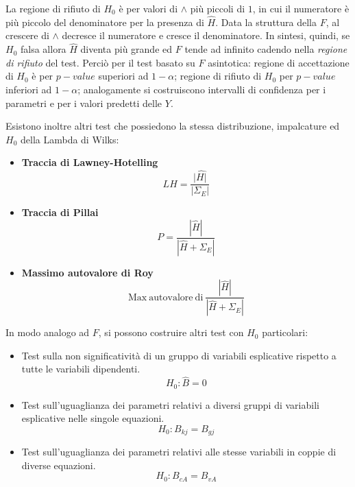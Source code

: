 \documentclass[a4page, 11pt]{article} %
\begin{document}
La regione di rifiuto di $H_0$ è per valori di $\wedge$ più piccoli di $1$, in cui il numeratore è più piccolo del denominatore per la presenza di $\hat{H}$.
Data la struttura della $F$, al crescere di $\wedge$ decresce il numeratore e cresce il denominatore. In sintesi, quindi, se $H_0$ falsa allora $\hat{H}$ diventa più grande ed $F$ tende ad infinito cadendo nella \textit{regione di rifiuto} del test.
\newline
\newline
Perciò per il test basato su $F$ asintotica:
regione di accettazione di $H_0$ è per $p-value$ superiori ad $1-\alpha$;
regione di rifiuto di $H_0$ per $p-value$ inferiori ad $1-\alpha$;
analogamente si costruiscono intervalli di confidenza per i parametri e per i valori predetti delle $Y$.

Esistono inoltre altri test che possiedono la stessa distribuzione, impalcature ed $H_0$ della Lambda di Wilks:
\begin{itemize}[noitemsep]
\item \textbf{Traccia di Lawney-Hotelling}
\begin{equation*}
LH = \frac{|\hat{H|}}{|\Sigma_E|}
\end{equation*}
\item \textbf{Traccia di Pillai}
\begin{equation*}
P = \frac{|\hat{H}|}{|\hat{H}+\Sigma_E|}
\end{equation*}
\item \textbf{Massimo autovalore di Roy}
\begin{equation*}
\mathrm{Max \ autovalore\  di \ } \frac{|\hat{H}|}{|\hat{H}+\Sigma_E|}
\end{equation*}
\end{itemize}
In modo analogo ad $F$, si possono costruire altri test con $H_0$ particolari:
\begin{itemize}[noitemsep]
\item Test sulla non significatività di un gruppo di variabili esplicative rispetto a tutte le variabili dipendenti.
\begin{equation*}
H_0 : \hat{B} = 0
\end{equation*}
\item Test sull’uguaglianza dei parametri relativi a diversi gruppi di variabili esplicative nelle singole equazioni.
\begin{equation*}
H_0 : B_{kj} = B_{gj} 
\end{equation*}
\item Test sull'uguaglianza dei parametri relativi alle stesse variabili in coppie di diverse equazioni.
\begin{equation*}
H_0 : B_{cA} = B_{vA}
\end{equation*}
\end{itemize}
\end{document}
